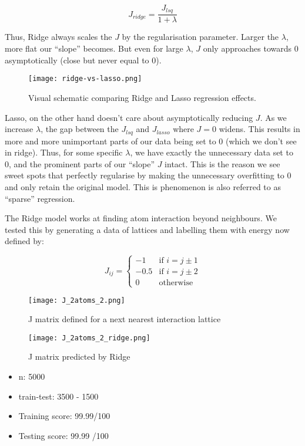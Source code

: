 \[J_{ridge}=\frac{J_{lsq}}{1+\lambda}\]

Thus, Ridge always scales the $J$ by the regularisation parameter.
Larger the \(\lambda\), more flat our ``slope'' becomes.
But even for large \(\lambda\), $J$ only approaches towards 0 asymptotically (close but never equal to 0).

\begin{figure}[H]
    \centering
    \texttt{[image: ridge-vs-lasso.png]}
    \caption{Visual schematic comparing Ridge and Lasso regression effects.}
\end{figure}

Lasso, on the other hand doesn't care about asymptotically reducing $J$.
As we increase \(\lambda\), the gap between the \(J_{lsq}\) and \(J_{lasso}\) where $J=0$ widens.
This results in more and more unimportant parts of our data being set to 0 (which we don't see in ridge).
Thus, for some specific \(\lambda\), we have exactly the unnecessary data set to 0, and the prominent parts of our ``slope'' $J$ intact.
This is the reason we see sweet spots that perfectly regularise by making the unnecessary overfitting to 0 and only retain the original model.
This is phenomenon is also referred to as ``sparse'' regression.

The Ridge model works at finding atom interaction beyond neighbours. We tested this by generating a data of lattices and labelling them with energy now defined by:

\begin{equation*}
    J_{ij} = \left\{
        \begin{array}{ll}
            -1 & \mbox{if } i = j \pm 1\\
            -0.5 & \mbox{if } i = j \pm 2\\
            0 & \mbox{otherwise}
        \end{array}
    \right.
\end{equation*}

\begin{figure}[H]
    \centering
    \texttt{[image: J\_2atoms\_2.png]}
    \caption{J matrix defined for a next nearest interaction lattice}
\end{figure}

\begin{figure}[H]
    \centering
    \texttt{[image: J\_2atoms\_2\_ridge.png]}
    \caption{J matrix predicted by Ridge}
\end{figure}

\begin{itemize}
    \item n: 5000
    \item train-test: 3500 - 1500
    \item Training score: 99.99/100
    \item Testing score: 99.99 /100 
\end{itemize}


